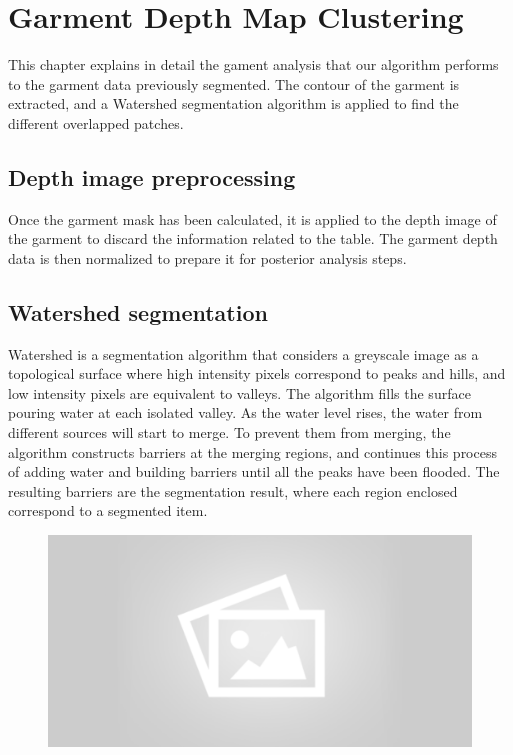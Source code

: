 \chapter{Garment Depth Map Clustering}
\label{garment_clustering}

This chapter explains in detail the gament analysis that our algorithm performs to the garment data previously segmented. The contour of the garment is extracted, and a Watershed segmentation algorithm is applied to find the different overlapped patches.

\section{Depth image preprocessing}
\label{depth_image_preprocessing}

Once the garment mask has been calculated, it is applied to the depth image of the garment to discard the information related to the table. The garment depth data is then normalized to prepare it for posterior analysis steps.


\section{Watershed segmentation}

Watershed is a segmentation algorithm that considers a greyscale image as a topological surface where high intensity pixels correspond to peaks and hills, and low intensity pixels are equivalent to valleys. The algorithm fills the surface pouring water at each isolated valley. As the water level rises, the water from different sources will start to merge. To prevent them from merging, the algorithm constructs barriers at the merging regions, and continues this process of adding water and building barriers until all the peaks have been flooded. The resulting barriers are the segmentation result, where each region enclosed correspond to a segmented item.

\begin{figure}[thpb]
    \centering
    \includegraphics[width=0.7
    \textwidth]{figures/placeholder2.png}
    \caption{}
    \label{fig:watershed_example}
\end{figure}


